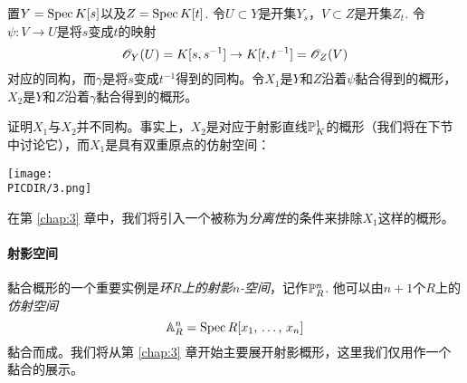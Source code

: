 \begin{exe}\label{exe:1.44}
置$Y=\spec K[s]$以及$Z=\spec K[t]$. 令$U\subset Y$是开集$Y_s$，$V\subset Z$是开集$Z_t$. 令$\psi:V\to U$是将$s$变成$t$的映射
\[
	\oo_Y(U)=K[s,s^{-1}]\to K[t,t^{-1}]=\oo_Z(V)
\]
对应的同构，而$\gamma$是将$s$变成$t^{-1}$得到的同构。令$X_1$是$Y$和$Z$沿着$\psi$黏合得到的概形，$X_2$是$Y$和$Z$沿着$\gamma$黏合得到的概形。

证明$X_1$与$X_2$并不同构。事实上，$X_2$是对应于射影直线$\P_K^1$的概形（我们将在下节中讨论它），而$X_1$是具有双重原点的仿射空间：

\begin{center}\texttt{[image: \\PICDIR/3.png]}\end{center}

在第 \ref{chap:3} 章中，我们将引入一个被称为\textit{分离性}的条件来排除$X_1$这样的概形。
\end{exe}

\paragraph*{射影空间}
黏合概形的一个重要实例是\textit{环$R$上的射影$n$-空间}，记作$\P^n_R$. 他可以由$n+1$个$R$上的\textit{仿射空间}
\[
	\A_R^n=\spec R[\text{$x_1$, $\dots$, $x_n$}]
\]
黏合而成。我们将从第 \ref{chap:3} 章开始主要展开射影概形，这里我们仅用作一个黏合的展示。

